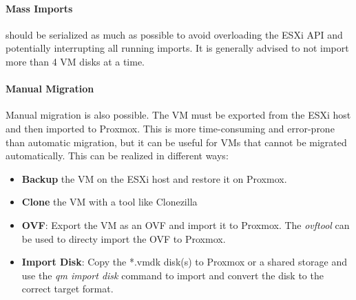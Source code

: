 \paragraph{Mass Imports} should be serialized as much as possible to avoid overloading the ESXi API and potentially interrupting all running imports.
It is generally advised to not import more than 4 VM disks at a time.

\paragraph{Manual Migration}
Manual migration is also possible. The VM must be exported from the ESXi host and then imported to Proxmox. This is more time-consuming and error-prone than automatic migration, but it can be useful for VMs that cannot be migrated automatically.\newline
This can be realized in different ways:
\begin{itemize}
    \item \textbf{Backup} the VM on the ESXi host and restore it on Proxmox.
    \item \textbf{Clone} the VM with a tool like Clonezilla
    \item \textbf{OVF}: Export the VM as an OVF and import it to Proxmox. The \textit{ovftool} can be used to directy import the OVF to Proxmox.
    \item \textbf{Import Disk}: Copy the *.vmdk disk(s) to Proxmox or a shared storage and use the \textit{qm import disk} command to import and convert the disk to the correct target format.
\end{itemize}
